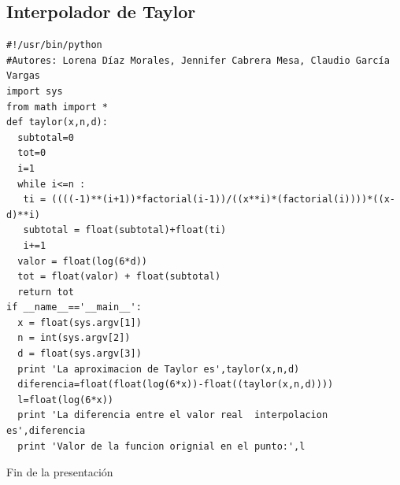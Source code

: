 \documentclass{beamer}
\begin{document}
\subsection{Interpolador de Taylor}
\scriptsize
\begin{frame}[fragile]
\begin{verbatim}
#!/usr/bin/python
#Autores: Lorena Díaz Morales, Jennifer Cabrera Mesa, Claudio García Vargas
import sys
from math import *
def taylor(x,n,d):                                                                                                        
  subtotal=0                                                                                                              
  tot=0                                                                                                                   
  i=1                                                                                                                     
  while i<=n :                                                                                                            
   ti = ((((-1)**(i+1))*factorial(i-1))/((x**i)*(factorial(i))))*((x-d)**i)                                               
   subtotal = float(subtotal)+float(ti)                                                                                   
   i+=1                                                                                                                   
  valor = float(log(6*d))
  tot = float(valor) + float(subtotal)
  return tot
if __name__=='__main__':
  x = float(sys.argv[1])
  n = int(sys.argv[2])
  d = float(sys.argv[3])
  print 'La aproximacion de Taylor es',taylor(x,n,d)
  diferencia=float(float(log(6*x))-float((taylor(x,n,d))))
  l=float(log(6*x))
  print 'La diferencia entre el valor real  interpolacion es',diferencia
  print 'Valor de la funcion orignial en el punto:',l
\end{verbatim}
\end{frame}


\begin{frame}
\begin{center}
 \huge
    Fin de la presentación
\end{center}
\end{frame}

\end{document}

